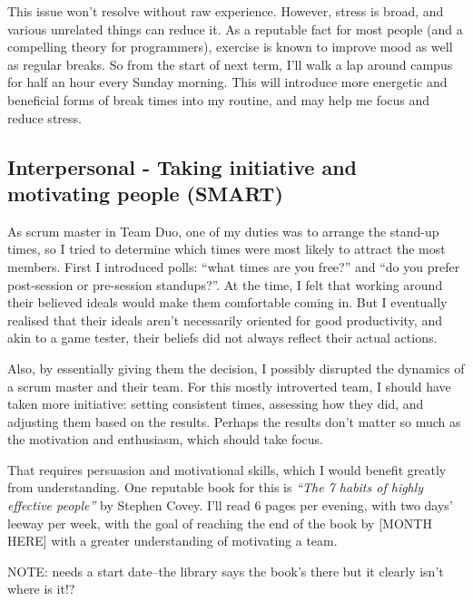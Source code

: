\documentclass{scrartcl}
\begin{document}
This issue won't resolve without raw experience. However, stress is broad, and various unrelated things can reduce it. As a reputable fact for most people (and a compelling theory for programmers), exercise is known to improve mood as well as regular breaks. So from the start of next term, I'll walk a lap around campus for half an hour every Sunday morning. This will introduce more energetic and beneficial forms of break times into my routine, and may help me focus and reduce stress.


\subsection{Interpersonal - Taking initiative and motivating people (SMART)} %
As scrum master in Team Duo, one of my duties was to arrange the stand-up times, so I tried to determine which times were most likely to attract the most members. First I introduced polls: ``what times are you free?'' and ``do you prefer post-session or pre-session standups?''. At the time, I felt that working around their believed ideals would make them comfortable coming in. But I eventually realised that their ideals aren't necessarily oriented for good productivity, and akin to a game tester, their beliefs did not always reflect their actual actions.

Also, by essentially giving them the decision, I possibly disrupted the dynamics of a scrum master and their team. For this mostly introverted team, I should have taken more initiative: setting consistent times, assessing how they did, and adjusting them based on the results. Perhaps the results don't matter so much as the motivation and enthusiasm, which should take focus.

That requires persuasion and motivational skills, which I would benefit greatly from understanding. One reputable book for this is \textit{``The 7 habits of highly effective people''} by Stephen Covey. I'll read 6 pages per evening, with two days' leeway per week, with the goal of reaching the end of the book by [MONTH HERE] with a greater understanding of motivating a team.

NOTE: needs a start date--the library says the book's there but it clearly isn't where is it!?

\end{document}
